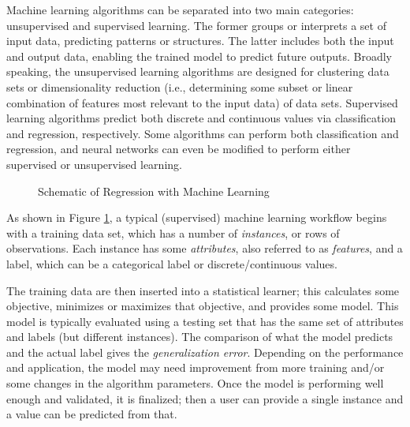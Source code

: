 Machine learning algorithms can be separated into two main categories:
unsupervised and supervised learning.  The former groups or interprets a set of
input data, predicting patterns or structures. The latter includes both the
input and output data, enabling the trained model to predict future outputs.
Broadly speaking, the unsupervised learning algorithms are designed for
clustering data sets or dimensionality reduction (i.e., determining some subset
or linear combination of features most relevant to the input data) of data
sets.  Supervised learning algorithms predict both discrete and continuous
values via classification and regression, respectively. Some algorithms can
perform both classification and regression, and neural networks can even be
modified to perform either supervised or unsupervised learning. 
\\
\begin{figure}[!htb]
  \caption{Schematic of Regression with Machine Learning}
  \label{fig:supervised}
\end{figure}

As shown in Figure \ref{fig:supervised}, a typical (supervised) machine
learning workflow begins with a training data set, which has a number of
\textit{instances}, or rows of observations.  Each instance has some
\textit{attributes}, also referred to as \textit{features}, and a label, which
can be a categorical label or discrete/continuous values.  

The training data are then inserted into a statistical learner; this calculates
some objective, minimizes or maximizes that objective, and provides some model.
This model is typically evaluated using a testing set that has the same set of
attributes and labels (but different instances). The comparison of what the
model predicts and the actual label gives the \textit{generalization error}.
Depending on the performance and application, the model may need improvement
from more training and/or some changes in the algorithm parameters. Once the
model is performing well enough and validated, it is finalized; then a user can
provide a single instance and a value can be predicted from that. 

